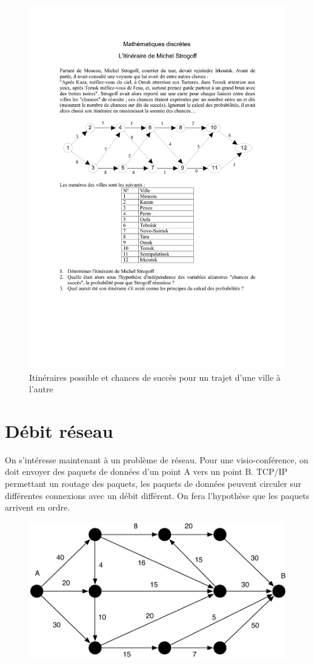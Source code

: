 \documentclass[paper=a4, fontsize=11pt]{scrartcl} %
\numberwithin{equation}{section} %
\numberwithin{figure}{section} %
\numberwithin{table}{section} %
\begin{document}
\begin{figure}[htbp]
\begin{center}
	\includegraphics[width=.8\textwidth]{strogoff.pdf}
	\caption{Itinéraires possible et chances de succès pour un trajet d'une ville à l'autre}
	\label{fig:ms}
\end{center}
\end{figure}

\section{Débit réseau}

On s'intéresse maintenant à un problème de réseau. Pour une visio-conférence, on doit envoyer des paquets de données d'un point A vers un point B. TCP/IP permettant un routage des paquets, les paquets de données peuvent circuler sur différentes connexions avec un débit différent. On fera l'hypothèse que les paquets arrivent en ordre. 

\begin{figure}[htbp]
\begin{center}
	\includegraphics[width=.8\textwidth]{graphe1.pdf}
\end{center}
\end{figure}
\end{document}
